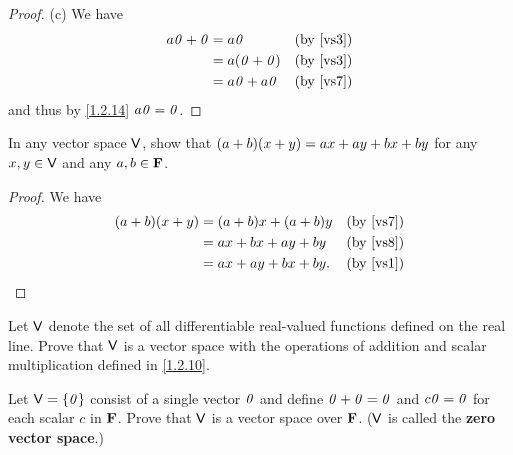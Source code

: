 \begin{proof}{(c)}
    We have
    \begin{align*}
        a\zv + \zv & = a\zv           &  & \text{(by \ref{vs3})} \\
                   & = a\p{\zv + \zv} &  & \text{(by \ref{vs3})} \\
                   & = a\zv + a\zv    &  & \text{(by \ref{vs7})}
    \end{align*}
    and thus by \cref{1.2.14} \(a\mathit{0} = \mathit{0}\).
\end{proof}

\exercisesection

\setcounter{ex}{7}
\begin{ex}\label{ex:1.2.8}
    In any vector space \(\mathsf{V}\), show that \(\p{a + b}\p{x + y} = ax + ay + bx + by\) for any \(x, y \in \mathsf{V}\) and any \(a, b \in \mathbf{F}\).
\end{ex}

\begin{proof}
    We have
    \begin{align*}
        \p{a + b}\p{x + y} & = \p{a + b} x + \p{a + b} y &  & \text{(by \ref{vs7})} \\
                           & = ax + bx + ay + by         &  & \text{(by \ref{vs8})} \\
                           & = ax + ay + bx + by.        &  & \text{(by \ref{vs1})}
    \end{align*}
\end{proof}

\setcounter{ex}{9}
\begin{ex}\label{ex:1.2.10}
    Let \(\mathsf{V}\) denote the set of all differentiable real-valued functions defined on the real line.
    Prove that \(\mathsf{V}\) is a vector space with the operations of addition and scalar multiplication defined in \cref{1.2.10}.
\end{ex}

\begin{ex}\label{ex:1.2.11}
    Let \(\mathsf{V} = \left\lbrace\mathit{0}\right\rbrace\) consist of a single vector \(\mathit{0}\) and define \(\mathit{0} + \mathit{0} = \mathit{0}\) and \(c\mathit{0} = \mathit{0}\) for each scalar \(c\) in \(\mathbf{F}\).
    Prove that \(\mathsf{V}\) is a vector space over \(\mathbf{F}\).
    (\(\mathsf{V}\) is called the \textbf{zero vector space}.)
\end{ex}

